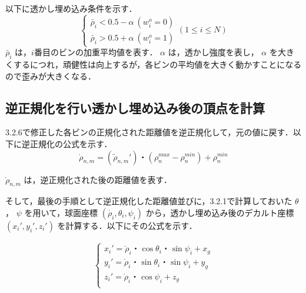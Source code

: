 \documentclass[11pt]{jreport}
\begin{document}
{以下に透かし埋め込み条件を示す．
\begin{equation}
\left\{
\begin{array}{ll}
\bar{\rho}_i <0.5-\alpha\ (w_i^o=0)\\
\bar{\rho}_i >0.5+\alpha\ (w_i^o=1)

    \end{array}
\right.
(1 \le i \le N)
\end{equation}
\begin{math}
\bar{\rho}_i
\end{math}
は，\begin{math}i\end{math}番目のビンの加重平均値を表す．
\begin{math}
\alpha
\end{math}
は，透かし強度を表し，
\begin{math}
\alpha
\end{math}
を大きくするにつれ，頑健性は向上するが，各ビンの平均値を大きく動かすことになるので歪みが大きくなる．
\subsection{逆正規化を行い透かし埋め込み後の頂点を計算}

3.2.6で修正した各ビンの正規化された距離値を逆正規化して，元の値に戻す．以下に逆正規化の公式を示す．
\begin{equation}
\grave{\rho}_{n,m}=(\tilde{\rho}_{n,m}')・(\rho_n^{max}-\rho_n^{min})+\rho_n^{min}
\end{equation}

\begin{math}
\grave{\rho}_{n,m}
\end{math}
は，逆正規化された後の距離値を表す．

そして，最後の手順として逆正規化した距離値並びに，3.2.1で計算しておいた
\begin{math}
\theta
\end{math}
，
\begin{math}
\psi
\end{math}
を用いて，球面座標
\begin{math}
(\grave{\rho_i},\theta_i,\psi_i)
\end{math}
から，透かし埋め込み後のデカルト座標
\begin{math}
(x_i',y_i',z_i')
\end{math}
を計算する．以下にその公式を示す．


\begin{eqnarray}
\left\{ \begin{array}{ll}
x_i'=\grave{\rho}_i・\cos\theta_i・\sin\psi_i+x_g \\
y_i'=\grave{\rho}_i・\sin\theta_i・\sin\psi_i+y_g \\
z_i'=\grave{\rho}_i・\cos\psi_i+z_g \\
\end{array} \right.
\end{eqnarray}


}
\end{document}
